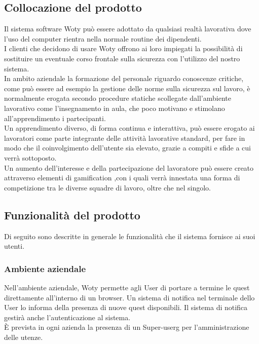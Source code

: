 \documentclass[10pt,a4paper]{article}
\begin{document}
\subsection{Collocazione del prodotto}

Il sistema software Woty può essere adottato da qualsiasi realtà lavorativa dove l’uso del computer rientra nella normale routine dei dipendenti. \\
I clienti che decidono di usare Woty offrono ai loro impiegati la possibilità di sostituire un eventuale corso frontale sulla sicurezza con l’utilizzo del nostro sistema.\\
In ambito aziendale la formazione del personale riguardo conoscenze critiche, come può essere ad esempio la gestione delle norme sulla sicurezza sul lavoro, è normalmente erogata secondo procedure statiche scollegate dall’ambiente lavorativo come l’insegnamento in aula, che poco motivano e stimolano all’apprendimento i partecipanti.\\
Un apprendimento diverso, di forma continua e interattiva, può essere erogato ai lavoratori come parte integrante delle attività lavorative standard, per fare in modo che il coinvolgimento dell’utente sia elevato, grazie a compiti e sfide a cui verrà sottoposto.\\
Un aumento dell’interesse e della partecipazione del lavoratore può essere creato attraverso elementi di gamification ,con i quali verrà innestata una forma di competizione tra le diverse squadre di lavoro, oltre che nel singolo.

\subsection{Funzionalità del prodotto}

Di seguito sono descritte in generale le funzionalità che il sistema fornisce ai suoi utenti.\\

\subsubsection{Ambiente aziendale}
Nell’ambiente aziendale, Woty permette agli User di portare a termine le quest direttamente all’interno di un browser. Un sistema di notifica nel terminale dello User lo informa della presenza di nuove quest disponibili. Il sistema di notifica gestirà anche l’autenticazione al sistema.\\ 
È prevista in ogni azienda la presenza di un Super-userg per l’amministrazione delle utenze.\\
\end{document}
